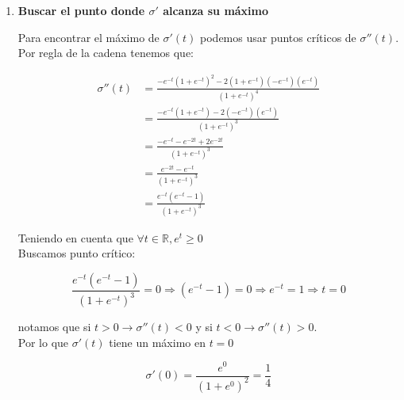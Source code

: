 \documentclass{article}
\begin{document}
\begin{enumerate}[label=\roman*]
  \item \textbf{Buscar el punto donde $\sigma'$ alcanza su máximo}
  
  Para encontrar el máximo de $\sigma'(t)$ podemos usar puntos críticos de $\sigma''(t)$.\\
  Por regla de la cadena tenemos que:

  \[
  \begin{aligned}
  \sigma''(t)
  &= \frac{-e^{-t}(1+e^{-t})^2 - 2(1+e^{-t})(-e^{-t})(e^{-t})}{(1+e^{-t})^4}\\
  &= \frac{-e^{-t}(1+e^{-t})-2(-e^{-t})(e^{-t})}{(1+e^{-t})^3}\\
  &= \frac{-e^{-t}-e^{-2t}+2e^{-2t}}{(1+e^{-t})^3}\\
  &= \frac{e^{-2t}-e^{-t}}{(1+e^{-t})^3}\\
  &= \frac{e^{-t}(e^{-t}-1)}{(1+e^{-t})^3}
  \end{aligned}
  \]

  Teniendo en cuenta que $\forall t \in \mathbb{R}, e^t \geq 0$\\
  Buscamos punto crítico:

  \[
  \frac{e^{-t}(e^{-t}-1)}{(1+e^{-t})^3} = 0
  \Rightarrow (e^{-t}-1) = 0
  \Rightarrow e^{-t} = 1
  \Rightarrow t = 0
  \]

  notamos que si $t > 0 \rightarrow \sigma''(t) < 0$ y si $t < 0 \rightarrow \sigma''(t) > 0$.\\ Por lo que $\sigma'(t)$ tiene un máximo en $t = 0$

  \[
  \sigma'(0) = \frac{e^{0}}{(1+e^{0})^{2}} = \frac{1}{4}
  \]
\end{enumerate}

\end{document}
